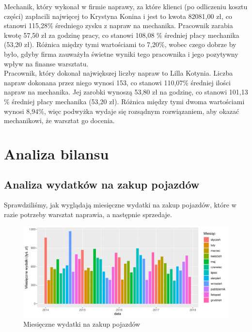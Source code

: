 \documentclass{article}\usepackage[]{graphicx}\usepackage[]{xcolor}
\makeatletter
\def\maxwidth{ %
  \ifdim\Gin@nat@width>\linewidth
    \linewidth
  \else
    \Gin@nat@width
  \fi
}
\newenvironment{knitrout}{}{} %
\makeatother
\begin{document}
Mechanik, który wykonał w firmie naprawy, za które klienci (po odliczeniu kosztu części) zapłacili najwięcej to Krystyna Konina i jest to kwota 82081,00 zł, co stanowi 115,28\% średniego zysku z napraw na mechanika. Pracownik zarabia kwotę 57,50 zł za godzinę pracy, co stanowi 108,08 \% średniej płacy mechanika (53,20 zł). Różnica między tymi wartościami to 7,20\%, wobec czego dobrze by było, gdyby firma zauważyła świetne wyniki tego pracownika i jego pozytywny wpływ na finanse warsztatu. \\

Pracownik, który dokonał największej liczby napraw to Lilla Kotynia. Liczba napraw dokonana przez niego wynosi 153, co stanowi 110,07\% średniej ilości napraw na mechanika. Jej zarobki wynoszą 53,80 zł na godzinę, co stanowi 101,13 \% średniej płacy mechanika (53,20 zł). Różnica między tymi dwoma wartościami wynosi 8,94\%, więc podwyżka wydaje się rozsądnym rozwiązaniem, aby okazać mechanikowi, że warsztat go docenia.

\section{Analiza bilansu}

\subsection{Analiza wydatków na zakup pojazdów}

Sprawdziliśmy, jak wyglądają miesięczne wydatki na zakup pojazdów, które w razie potrzeby warsztat naprawia, a następnie sprzedaje.

\begin{knitrout}
\color{fgcolor}\begin{figure}[H]

{\centering \includegraphics[width=\maxwidth]{figure/fig_zakup_pojazdu-1} 

}

\caption[Miesięczne wydatki na zakup pojazdów]{Miesięczne wydatki na zakup pojazdów}\label{fig:fig_zakup_pojazdu}
\end{figure}

\end{knitrout}
\end{document}
